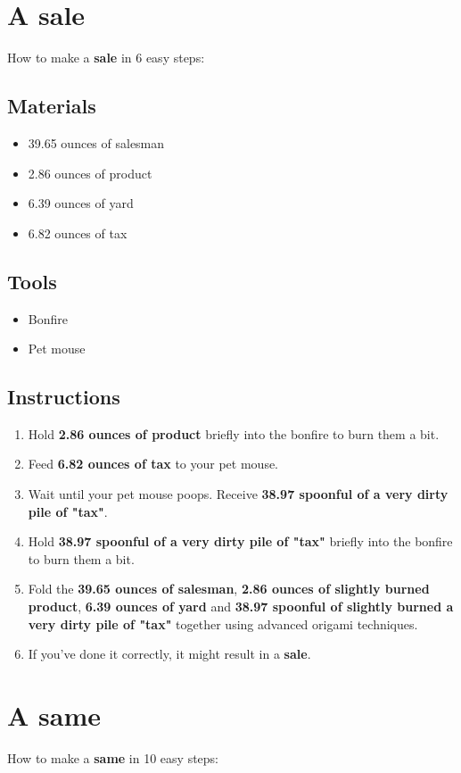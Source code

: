 \documentclass{article}
\begin{document}
\section{A sale}How to make a \textbf{sale} in 6 easy steps:

\subsection{Materials}\begin{itemize}
\item 
39.65 ounces of salesman
\item 
2.86 ounces of product
\item 
6.39 ounces of yard
\item 
6.82 ounces of tax
\end{itemize}
\subsection{Tools}\begin{itemize}
\item 
Bonfire
\item 
Pet mouse
\end{itemize}
\subsection{Instructions}\begin{enumerate}
\item 
Hold \textbf{2.86 ounces of product} briefly into the bonfire to burn them a bit.
\item 
Feed \textbf{6.82 ounces of tax} to your pet mouse.
\item 
Wait until your pet mouse poops. Receive \textbf{38.97 spoonful of a very dirty pile of "tax"}.
\item 
Hold \textbf{38.97 spoonful of a very dirty pile of "tax"} briefly into the bonfire to burn them a bit.
\item 
Fold the \textbf{39.65 ounces of salesman}, \textbf{2.86 ounces of slightly burned product}, \textbf{6.39 ounces of yard} and \textbf{38.97 spoonful of slightly burned a very dirty pile of "tax"} together using advanced origami techniques.
\item 
If you've done it correctly, it might result in a \textbf{sale}.
\end{enumerate}
\newpage
\section{A same}How to make a \textbf{same} in 10 easy steps:
\end{document}
